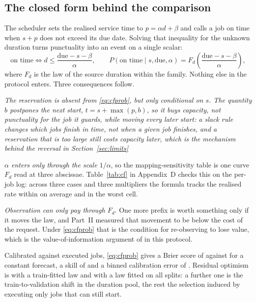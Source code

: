 \documentclass{swmcmthesis}
\begin{document}

\subsection{The closed form behind the comparison}
\label{sec:p3closed}

The scheduler sets the realised service time to $p=\alpha d+\beta$ and calls a job on
time when $s+p$ does not exceed its due date. Solving that inequality for the unknown
duration turns punctuality into an event on a single scalar:
\begin{equation}
\text{on time}\iff d\le\frac{\mathrm{due}-s-\beta}{\alpha},
\qquad
P(\text{on time}\mid s,\mathrm{due},\alpha)
= F_d\!\left(\frac{\mathrm{due}-s-\beta}{\alpha}\right),
\label{eq:cfprob}
\end{equation}
where $F_d$ is the law of the source duration within the family. Nothing else in the
protocol enters. Three consequences follow.

\emph{The reservation is absent from \eqref{eq:cfprob}, but only conditional on $s$. The
quantity $b$ postpones the next start, $t=s+\max(p,b)$, so it buys capacity, not
punctuality for the job it guards, while moving every later start: a slack rule changes
which jobs finish in time, not when a given job finishes, and a reservation that is too
large still costs capacity later, which is the mechanism behind the reversal in
Section~\ref{sec:limits}}

\emph{$\alpha$ enters only through the scale $1/\alpha$}, so the mapping-sensitivity table
is one curve $F_d$ read at three abscissae. Table~\ref{tab:cf} in Appendix~D checks this
on the per-job log: across three cases and three multipliers the formula tracks the
realised rate within \slotPCFMeanErr{} on average and \slotPCFMaxErr{} in the worst cell.

\emph{Observation can only pay through $F_d$}. One more prefix is worth something only if
it moves the law, and Part~II measured that movement to be below the cost of the request. Under \eqref{eq:cfprob} that is the condition for re-observing to lose value, which is the
value-of-information argument of \cite{howard1966} in this protocol.

Calibrated against \slotPCFJobs{} executed jobs, \eqref{eq:cfprob} gives a Brier score of
\slotPCFBrier{} against \slotPCFBrierConst{} for a constant forecast, a skill of
\slotPCFSkill{} and a binned calibration error of \slotPCFECE{}. Residual optimism is
\slotPCFShiftTrain{} with a train-fitted law and \slotPCFShiftAll{} with a law fitted on
all splits: a further one is the train-to-validation shift in the duration pool, the rest the
selection induced by executing only jobs that can still start.
\end{document}
